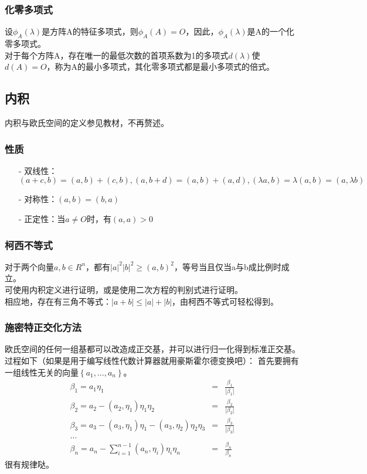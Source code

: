 \documentclass[UTF8]{ctexart}
\begin{document}
          \subsubsection{化零多项式}
          设$\phi_{A}(\lambda)$是方阵A的特征多项式，则$\phi_{A}(A)=\mathit{O}$，因此，$\phi_{A}(\lambda)$是A的一个化零多项式。\\
          \indent
          对于每个方阵A，存在唯一的最低次数的首项系数为1的多项式$d(\lambda)$使$d(A)=\mathit{O}$，称为A的最小多项式，其化零多项式都是最小多项式的倍式。
\subsection{内积}
内积与欧氏空间的定义参见教材，不再赘述。
\subsubsection{性质}
\begin{itemize}
\item[-]双线性：$(a+c,b)=(a,b)+(c,b),(a,b+d)=(a,b)+(a,d),(\lambda a,b)=\lambda(a,b)=(a,\lambda b)$
\item[-]对称性：$(a,b)=(b,a)$
\item[-]正定性：当$a\neq \mathit{O}$时，有$(a,a)>0$
\end{itemize}
\subsubsection{柯西不等式}
对于两个向量$a,b\in R^{n}$，都有$|a|^{2}|b|^{2}\geq(a,b)^{2}$，等号当且仅当a与b成比例时成立。\\
\indent
可使用内积定义进行证明，或是使用二次方程的判别式进行证明。\\
\indent
相应地，存在有三角不等式：$|a+b|\leq|a|+|b|$，由柯西不等式可轻松得到。
\subsubsection{施密特正交化方法}
欧氏空间的任何一组基都可以改造成正交基，并可以进行归一化得到标准正交基。
过程如下（如果是用于编写线性代数计算器就用豪斯霍尔德变换吧）：
首先要拥有一组线性无关的向量$\left\{a_1,...,a_n\right\}$。
\begin{eqnarray*}
    \beta_{1}=a_1 \eta_{1} & = & \frac{\beta_{1}}{|\beta_{1}|} \\
    \beta_{2}=a_2-(a_2,\eta_1)\eta_1 \eta_2&=&\frac{\beta_{2}}{|\beta_{2}|}\\
    \beta_{3}=a_3-(a_3,\eta_1)\eta_1-(a_3,\eta_2)\eta_2 \eta_3 &=& \frac{\beta_{3}}{|\beta_{3}|}\\
    ...\\
    \displaystyle \beta_{n}=a_n-\sum^{n-1}_{i=1}(a_n,\eta_i)\eta_i \eta_n&=& \frac{\beta_{n}}{\beta_{n}}
\end{eqnarray*}
很有规律哒。
\end{document}
